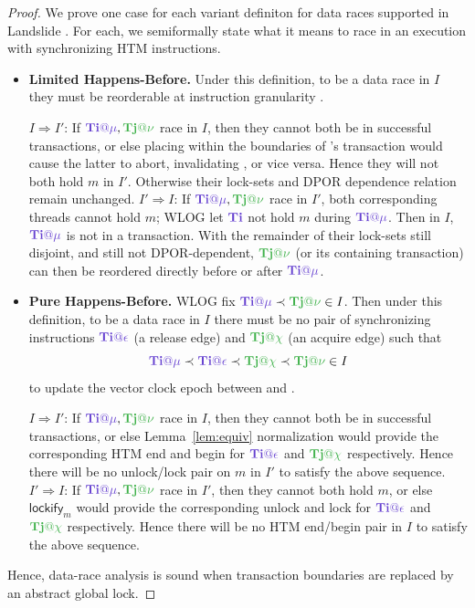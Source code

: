 \documentclass[10pt]{sigplanconf}
\begin{document}
\begin{proof}
We prove one case for each variant definiton for data races supported in Landslide \cite{quicksand}.
For each, we semiformally state what it means to race in an execution with synchronizing HTM instructions.

\begin{itemize}
	\item {\bf Limited Happens-Before.}
		Under this definition, to be a data race in $I$ they must be reorderable at instruction granularity
		\cite{tsan,hybriddatarace}.
		\begin{itemize}
			\llitem $I \Rightarrow I'$:
				If $\tiiat{\mu},\tjjat{\nu}$ race in $I$,
				then they cannot both be in successful transactions,
				or else placing \tiiat{\mu} within the boundaries of \tjjat{\nu}'s transaction
				would cause the latter to abort, invalidating \tjjat{\nu}, or vice versa.
				Hence they will not both hold $m$ in $I'$.
				Otherwise their lock-sets and DPOR dependence relation remain unchanged.
			\llitem $I' \Rightarrow I$:
				If $\tiiat{\mu},\tjjat{\nu}$ race in $I'$,
				both corresponding threads cannot hold $m$;
				WLOG let $\tii$ not hold $m$ during $\tiiat{\mu}$.
				Then in $I$, $\tiiat{\mu}$ is not in a transaction.
				With the remainder of their lock-sets still disjoint,
				and still not DPOR-dependent, $\tjjat{\nu}$ (or its containing transaction)
				can then be reordered directly before or after $\tiiat{\mu}$.
		\end{itemize}
	\item {\bf Pure Happens-Before.}
		WLOG fix $\tiiat{\mu} \prec \tjjat{\nu} \in I$.
		Then under this definition, to be a data race in $I$ there must be no pair of synchronizing instructions
		$\tiiat{\epsilon}$ (a release edge) and $\tjjat{\chi}$ (an acquire edge) such that
		\[
			\tiiat{\mu} \prec \tiiat{\epsilon} \prec \tjjat{\chi} \prec \tjjat{\nu} \in I
		\]
		to update the vector clock epoch between \tiiat{\mu} and \tjjat{\nu} \cite{djit,fasttrack}.
		\begin{itemize}
			\llitem $I \Rightarrow I'$:
				If $\tiiat{\mu},\tjjat{\nu}$ race in $I$,
				then they cannot both be in successful transactions,
				or else Lemma~\ref{lem:equiv} normalization would provide
				the corresponding HTM end and begin for $\tiiat{\epsilon}$ and $\tjjat{\chi}$ respectively.
				Hence there will be no unlock/lock pair on $m$ in $I'$ to satisfy the above sequence.
			\llitem $I' \Rightarrow I$:
				If $\tiiat{\mu},\tjjat{\nu}$ race in $I'$,
				then they cannot both hold $m$,
				or else $\mathsf{lockify}_m$ would provide the corresponding
				unlock and lock for $\tiiat{\epsilon}$ and $\tjjat{\chi}$ respectively.
				Hence there will be no HTM end/begin pair in $I$ to satisfy the above sequence.
		\end{itemize}
\end{itemize}
Hence, data-race analysis is sound when transaction boundaries are replaced by an abstract global lock.
\end{proof}
\end{document}
